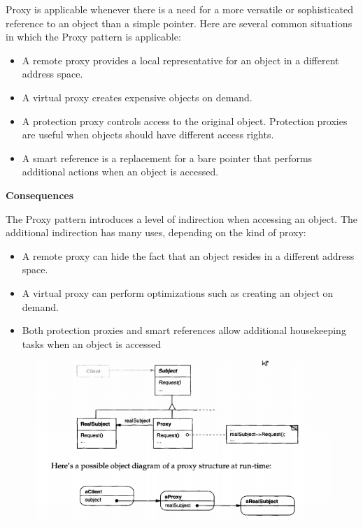 \documentclass{article}
\begin{document}
Proxy is applicable whenever there is a need for a more versatile or sophisticated reference to an object than a simple pointer. Here are several common situations in which the Proxy pattern is applicable:
\begin{itemize}
    \item A remote proxy provides a local representative for an object in a different address space.
    \item A virtual proxy creates expensive objects on demand.
    \item A protection proxy controls access to the original object. Protection proxies are useful when objects should have different access rights.
    \item A smart reference is a replacement for a bare pointer that performs additional actions when an object is accessed.
\end{itemize}

\textbf{Consequences}

The Proxy pattern introduces a level of indirection when accessing an object. The additional indirection has many uses, depending on the kind of proxy:
\begin{itemize}
    \item A remote proxy can hide the fact that an object resides in a different address space.
    \item A virtual proxy can perform optimizations such as creating an object on demand.
    \item Both protection proxies and smart references allow additional housekeeping tasks when an object is accessed
\end{itemize}

\begin{figure}[h]
    \centering
    \includegraphics[width=14cm]{diagrams/pattern-12-proxy.png}
\end{figure}
\end{document}
